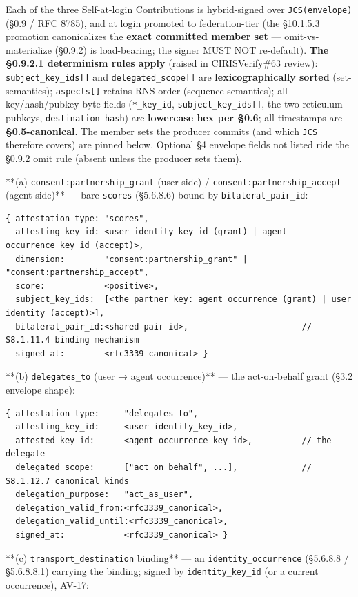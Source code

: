 \documentclass[11pt]{article}
\begin{document}
Each of the three Self-at-login Contributions is hybrid-signed over \texttt{JCS(envelope)} (§0.9 / RFC 8785), and at login promoted to federation-tier (the §10.1.5.3 promotion canonicalizes the \textbf{exact committed member set} — omit-vs-materialize (§0.9.2) is load-bearing; the signer MUST NOT re-default). \textbf{The §0.9.2.1 determinism rules apply} (raised in CIRISVerify\#63 review): \texttt{subject\_key\_ids[]} and \texttt{delegated\_scope[]} are \textbf{lexicographically sorted} (set-semantics); \texttt{aspects[]} retains RNS order (sequence-semantics); all key/hash/pubkey byte fields (\texttt{*\_key\_id}, \texttt{subject\_key\_ids[]}, the two reticulum pubkeys, \texttt{destination\_hash}) are \textbf{lowercase hex per §0.6}; all timestamps are \textbf{§0.5-canonical}. The member sets the producer commits (and which \texttt{JCS} therefore covers) are pinned below. Optional §4 envelope fields not listed ride the §0.9.2 omit rule (absent unless the producer sets them).


**(a) \texttt{consent:partnership\_grant} (user side) / \texttt{consent:partnership\_accept} (agent side)** — bare \texttt{scores} (§5.6.8.6) bound by \texttt{bilateral\_pair\_id}:

\begin{lstlisting}
{ attestation_type: "scores",
  attesting_key_id: <user identity_key_id (grant) | agent occurrence_key_id (accept)>,
  dimension:        "consent:partnership_grant" | "consent:partnership_accept",
  score:            <positive>,
  subject_key_ids:  [<the partner key: agent occurrence (grant) | user identity (accept)>],
  bilateral_pair_id:<shared pair id>,                       // S8.1.11.4 binding mechanism
  signed_at:        <rfc3339_canonical> }
\end{lstlisting}

**(b) \texttt{delegates\_to} (user → agent occurrence)** — the act-on-behalf grant (§3.2 envelope shape):

\begin{lstlisting}
{ attestation_type:     "delegates_to",
  attesting_key_id:     <user identity_key_id>,
  attested_key_id:      <agent occurrence_key_id>,          // the delegate
  delegated_scope:      ["act_on_behalf", ...],             // S8.1.12.7 canonical kinds
  delegation_purpose:   "act_as_user",
  delegation_valid_from:<rfc3339_canonical>,
  delegation_valid_until:<rfc3339_canonical>,
  signed_at:            <rfc3339_canonical> }
\end{lstlisting}

**(c) \texttt{transport\_destination} binding** — an \texttt{identity\_occurrence} (§5.6.8.8 / §5.6.8.8.1) carrying the binding; signed by \texttt{identity\_key\_id} (or a current occurrence), AV-17:
\end{document}
